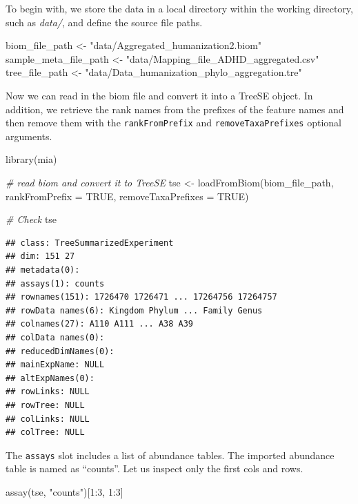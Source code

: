 \documentclass[
]{book}
\newenvironment{Shaded}{\begin{snugshade}}{\end{snugshade}}
\newcommand{\AttributeTok}[1]{\textcolor[rgb]{0.77,0.63,0.00}{#1}}
\newcommand{\CommentTok}[1]{\textcolor[rgb]{0.56,0.35,0.01}{\textit{#1}}}
\newcommand{\ConstantTok}[1]{\textcolor[rgb]{0.00,0.00,0.00}{#1}}
\newcommand{\DecValTok}[1]{\textcolor[rgb]{0.00,0.00,0.81}{#1}}
\newcommand{\FunctionTok}[1]{\textcolor[rgb]{0.00,0.00,0.00}{#1}}
\newcommand{\NormalTok}[1]{#1}
\newcommand{\OtherTok}[1]{\textcolor[rgb]{0.56,0.35,0.01}{#1}}
\newcommand{\SpecialCharTok}[1]{\textcolor[rgb]{0.00,0.00,0.00}{#1}}
\newcommand{\StringTok}[1]{\textcolor[rgb]{0.31,0.60,0.02}{#1}}
\begin{document}
To begin with, we store the data in a local directory within the working
directory, such as \emph{data/}, and define the source file paths.

\begin{Shaded}
\begin{Highlighting}[]
\NormalTok{biom\_file\_path }\OtherTok{\textless{}{-}} \StringTok{"data/Aggregated\_humanization2.biom"}
\NormalTok{sample\_meta\_file\_path }\OtherTok{\textless{}{-}} \StringTok{"data/Mapping\_file\_ADHD\_aggregated.csv"}
\NormalTok{tree\_file\_path }\OtherTok{\textless{}{-}} \StringTok{"data/Data\_humanization\_phylo\_aggregation.tre"}
\end{Highlighting}
\end{Shaded}

Now we can read in the biom file and convert it into a TreeSE object. In addition, we retrieve the rank names from the prefixes of the feature names and then remove them with the \texttt{rankFromPrefix} and \texttt{removeTaxaPrefixes} optional arguments.

\begin{Shaded}
\begin{Highlighting}[]
\FunctionTok{library}\NormalTok{(mia)}

\CommentTok{\# read biom and convert it to TreeSE}
\NormalTok{tse }\OtherTok{\textless{}{-}} \FunctionTok{loadFromBiom}\NormalTok{(biom\_file\_path,}
                    \AttributeTok{rankFromPrefix =} \ConstantTok{TRUE}\NormalTok{,}
                    \AttributeTok{removeTaxaPrefixes =} \ConstantTok{TRUE}\NormalTok{)}

\CommentTok{\# Check}
\NormalTok{tse}
\end{Highlighting}
\end{Shaded}

\begin{verbatim}
## class: TreeSummarizedExperiment 
## dim: 151 27 
## metadata(0):
## assays(1): counts
## rownames(151): 1726470 1726471 ... 17264756 17264757
## rowData names(6): Kingdom Phylum ... Family Genus
## colnames(27): A110 A111 ... A38 A39
## colData names(0):
## reducedDimNames(0):
## mainExpName: NULL
## altExpNames(0):
## rowLinks: NULL
## rowTree: NULL
## colLinks: NULL
## colTree: NULL
\end{verbatim}

The \texttt{assays} slot includes a list of abundance tables. The imported
abundance table is named as ``counts''. Let us inspect only the first
cols and rows.

\begin{Shaded}
\begin{Highlighting}[]
\FunctionTok{assay}\NormalTok{(tse, }\StringTok{"counts"}\NormalTok{)[}\DecValTok{1}\SpecialCharTok{:}\DecValTok{3}\NormalTok{, }\DecValTok{1}\SpecialCharTok{:}\DecValTok{3}\NormalTok{]}
\end{Highlighting}
\end{Shaded}
\end{document}
